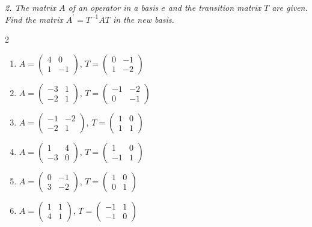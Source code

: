 \emph{2. The matrix $A$ of an operator in a basis $e$ and the transition matrix $T$ are given. Find the matrix $A^{\prime}=T^{-1}AT$ in the new basis.}
\bigskip
\begin{multicols}{2}\raggedright
\begin{enumerate}[label=\arabic*., leftmargin=*]
\item $A=\begin{pmatrix}4 & 0\\ 1 & -1\end{pmatrix}$, $T=\begin{pmatrix}0 & -1\\ 1 & -2\end{pmatrix}$
\item $A=\begin{pmatrix}-3 & 1\\ -2 & 1\end{pmatrix}$, $T=\begin{pmatrix}-1 & -2\\ 0 & -1\end{pmatrix}$
\item $A=\begin{pmatrix}-1 & -2\\ -2 & 1\end{pmatrix}$, $T=\begin{pmatrix}1 & 0\\ 1 & 1\end{pmatrix}$
\item $A=\begin{pmatrix}1 & 4\\ -3 & 0\end{pmatrix}$, $T=\begin{pmatrix}1 & 0\\ -1 & 1\end{pmatrix}$
\item $A=\begin{pmatrix}0 & -1\\ 3 & -2\end{pmatrix}$, $T=\begin{pmatrix}1 & 0\\ 0 & 1\end{pmatrix}$
\item $A=\begin{pmatrix}1 & 1\\ 4 & 1\end{pmatrix}$, $T=\begin{pmatrix}-1 & 1\\ -1 & 0\end{pmatrix}$

\end{enumerate}
\end{multicols}
